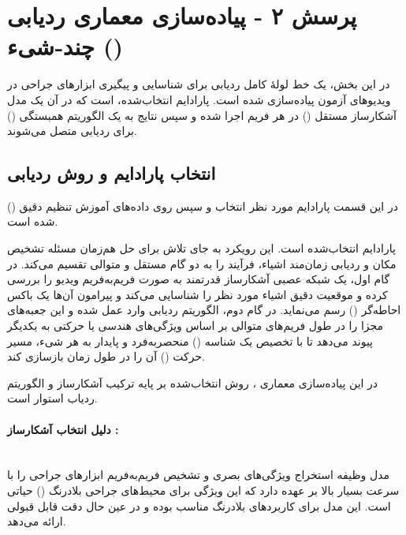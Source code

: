 \documentclass{article}
\begin{document}
\section{پرسش ۲ - پیاده‌سازی معماری ردیابی چند‑شیء ()}

در این بخش، یک خط لولۀ کامل ردیابی برای شناسایی و پیگیری ابزارهای جراحی در ویدیوهای آزمون پیاده‌سازی شده است. پارادایم انتخاب‌شده،  است که در آن یک مدل آشکارساز مستقل () در هر فریم اجرا شده و سپس نتایج به یک الگوریتم همبستگی () برای ردیابی متصل می‌شوند.

\subsection{انتخاب پارادایم و روش ردیابی}
در این قسمت پارادایم مورد نظر انتخاب و سپس روی داده‌های آموزش تنظیم دقیق () شده است.

پارادایم انتخاب‌شده  است. این رویکرد به جای تلاش برای حل هم‌زمان مسئله تشخیص مکان و ردیابی زمان‌مند اشیاء، فرآیند را به دو گام مستقل و متوالی تقسیم می‌کند. در گام اول، یک شبکه عصبی آشکارساز قدرتمند به صورت فریم‌به‌فریم ویدیو را بررسی کرده و موقعیت دقیق اشیاء مورد نظر را شناسایی می‌کند و پیرامون آن‌ها یک باکس احاطه‌گر () رسم می‌نماید. در گام دوم، الگوریتم ردیابی وارد عمل شده و این جعبه‌های مجزا را در طول فریم‌های متوالی بر اساس ویژگی‌های هندسی یا حرکتی به یکدیگر پیوند می‌دهد تا با تخصیص یک شناسه () منحصربه‌فرد و پایدار به هر شیء، مسیر حرکت () آن را در طول زمان بازسازی کند. 

در این پیاده‌سازی معماری ، روش انتخاب‌شده بر پایه ترکیب آشکارساز  و الگوریتم ردیاب  استوار است. 

\paragraph{دلیل انتخاب آشکارساز :} \mbox{}\\
مدل  وظیفه استخراج ویژگی‌های بصری و تشخیص فریم‌به‌فریم ابزارهای جراحی را با سرعت بسیار بالا بر عهده دارد که این ویژگی برای محیط‌های جراحی بلادرنگ () حیاتی است. این مدل برای کاربردهای بلادرنگ مناسب بوده و در عین حال دقت قابل قبولی ارائه می‌دهد. 
\end{document}
